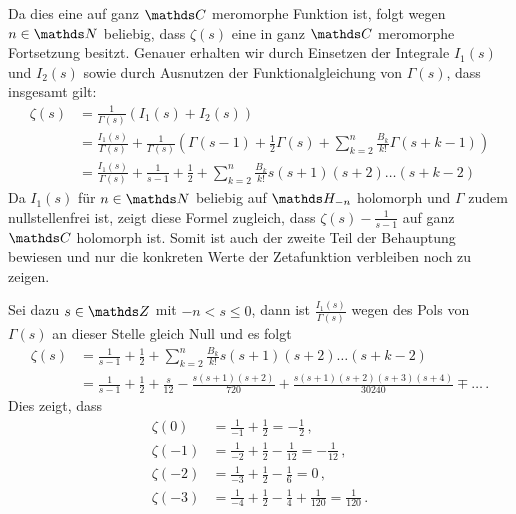\begin{bewe}
Da dies eine auf ganz $\CC$ meromorphe Funktion ist, folgt wegen $n \in \NN$ beliebig, dass $\zeta (s)$ eine in ganz $\CC$ meromorphe Fortsetzung besitzt. Genauer erhalten wir durch Einsetzen der Integrale $I_1(s)$ und $I_2(s)$ sowie durch Ausnutzen der Funktionalgleichung von $\Gamma(s)$, dass insgesamt gilt:
\begin{align*}
	\zeta(s) 
	&= \frac 1{\Gamma(s)} \left( I_1(s) + I_2(s) \right) \\
	&= \frac {I_1(s)}{\Gamma(s)} + \frac 1{\Gamma(s)} \left( \Gamma(s-1) + \frac 12 \Gamma(s) + \sum_{k=2}^n \frac {B_k}{k!} \Gamma(s+k-1) \right) \\
	&= \frac {I_1(s)}{\Gamma(s)} + \frac 1{s-1} + \frac 12 + \sum_{k=2}^n \frac{B_k}{k!} s(s+1)(s+2)\ldots(s+k-2)
\end{align*}
Da $I_1(s)$ für $n \in \NN$ beliebig auf $\HH_{-n}$ holomorph und $\Gamma$ zudem nullstellenfrei ist, zeigt diese Formel zugleich, dass $\zeta(s) - \frac 1{s-1}$ auf ganz $\CC$ holomorph ist. Somit ist auch der zweite Teil der Behauptung bewiesen und nur die konkreten Werte der Zetafunktion verbleiben noch zu zeigen.

Sei dazu $s \in \ZZ$ mit $-n < s \leq 0$, dann ist $\frac {I_1(s)}{\Gamma(s)}$ wegen des Pols von $\Gamma(s)$ an dieser Stelle gleich Null und es folgt
\begin{align*}
	\zeta(s) 
	&= \frac 1{s-1} + \frac 12 + \sum_{k=2}^n \frac{B_k}{k!} s(s+1)(s+2)\ldots(s+k-2) \\
	&= \frac 1{s-1} + \frac 12 + \frac s{12} - \frac {s(s+1)(s+2)}{720} + \frac {s(s+1)(s+2)(s+3)(s+4)}{30240} \mp \ldots
	\,.
\end{align*}
Dies zeigt, dass 
\begin{align*}
	\zeta(0) &= \frac 1{-1} + \frac 12 = - \frac 12 \,, \\
	\zeta(-1) &= \frac 1{-2} + \frac 12 - \frac 1{12} = -\frac 1{12} \,, \\
	\zeta(-2) &= \frac 1{-3} + \frac 12 - \frac 16 = 0 \,, \\
	\zeta(-3) &= \frac 1{-4} + \frac 12 - \frac 14 + \frac 1{120} = \frac 1{120} \,.
\end{align*}


\end{bewe}
